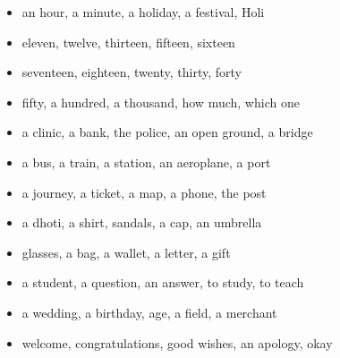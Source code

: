 \begin{itemize}
\raggedright
  \item an hour, a minute, a holiday, a festival, Holi
  \item eleven, twelve, thirteen, fifteen, sixteen
  \item seventeen, eighteen, twenty, thirty, forty
  \item fifty, a hundred, a thousand, how much, which one
  \item a clinic, a bank, the police, an open ground, a bridge
  \item a bus, a train, a station, an aeroplane, a port
  \item a journey, a ticket, a map, a phone, the post
  \item a dhoti, a shirt, sandals, a cap, an umbrella
  \item glasses, a bag, a wallet, a letter, a gift
  \item a student, a question, an answer, to study, to teach
  \item a wedding, a birthday, age, a field, a merchant
  \item welcome, congratulations, good wishes, an apology, okay
\end{itemize}

